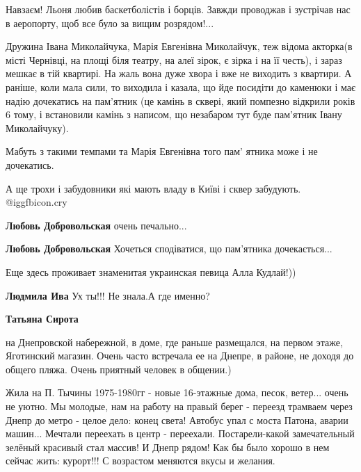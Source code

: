 \begin{itemize}
\begin{itemize}
\begin{itemize}
Навзаєм! Льоня любив баскетболістів і борців. Завжди проводжав і зустрічав нас
в аеропорту, щоб все було за вищим розрядом!...

\end{itemize} %

\end{itemize} %


Дружина Івана Миколайчука, Марія Евгенівна Миколайчук, теж відома акторка(в
місті Чернівці, на площі біля театру, на алеї зірок, є зірка і на її честь), і
зараз мешкає в тій квартирі. На жаль вона дуже хвора і вже не виходить з
квартири. А раніше, коли мала сили, то виходила і казала, що йде посидіти до
каменюки і має надію дочекатись на пам'ятник (це камінь в сквері, який помпезно
відкрили років 6 тому, і встановили камінь з написом, що незабаром тут буде
пам'ятник Івану Миколайчуку).

Мабуть з такими темпами та Марія Евгенівна того пам' ятника може і не
дочекатись.

А ще трохи і забудовники які мають владу в Київі і сквер забудують.  @igg{fbicon.cry} 

\begin{itemize} %
\textbf{Любовь Добровольская} очень печально...

\textbf{Любовь Добровольская} Хочеться сподіватися, що пам'ятника дочекається...
\end{itemize} %

Еще здесь проживает знаменитая украинская певица Алла Кудлай!))

\begin{itemize} %
\textbf{Людмила Ива} Ух ты!!! Не знала.А где именно?

\textbf{Татьяна Сирота} 

на Днепровской набережной, в доме, где раньше размещался, на первом этаже,
Яготинский магазин. Очень часто встречала ее на Днепре, в районе, не доходя до
общего пляжа. Очень приятный человек в общении.)

\end{itemize} %


Жила на П. Тычины 1975-1980гг - новые 16-этажные дома, песок, ветер... очень не
уютно. Мы молодые, нам на работу на правый берег - переезд трамваем через Днепр до
метро - целое дело: конец света! Автобус упал с моста Патона, аварии машин... Мечтали
переехать в центр - переехали. Постарели-какой замечательный зелёный красивый
стал массив! И Днепр рядом! Как бы было хорошо в нем сейчас жить: курорт!!! С
возрастом меняются вкусы и желания.


\end{itemize}
